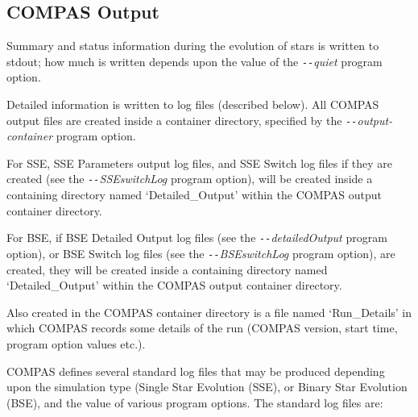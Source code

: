 \newpage
\subsection{COMPAS Output}\label{sec:COMPASOutput}

Summary and status information during the evolution of stars is written to stdout; how much is written depends upon the value of the \textit{\texttt{-{}-}quiet} program option.  

Detailed information is written to log files (described below).  All COMPAS output files are created inside a container directory, specified by the \textit{\texttt{-{}-}output-container} program option.

For SSE, SSE Parameters output log files, and SSE Switch log files if they are created (see the \textit{\texttt{-{}-}SSEswitchLog} program option), will be created inside a containing directory named `Detailed\_Output' within the COMPAS output container directory.

For BSE, if BSE Detailed Output log files (see the \textit{\texttt{-{}-}detailedOutput} program option), or BSE Switch log files (see the \textit{\texttt{-{}-}BSEswitchLog} program option), are created, they will be created inside a containing directory named `Detailed\_Output' within the COMPAS output container directory.

Also created in the COMPAS container directory is a file named `Run\_Details' in which COMPAS records some details of the run (COMPAS version, start time, program option values etc.).

COMPAS defines several standard log files that may be produced depending upon the simulation type (Single Star Evolution (SSE), or Binary Star Evolution (BSE), and the value of various program options. The standard log files are:

